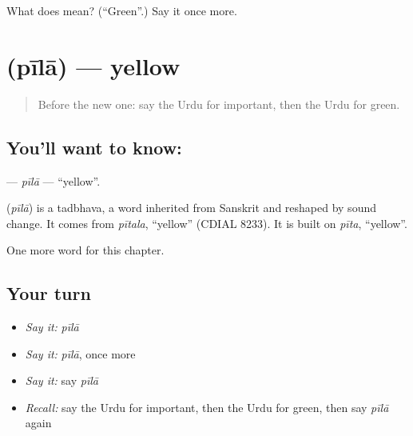 \begin{tcolorbox}[breakable,colback=teal!4,colframe=teal!35!black,title={Before you move on}]
What does  mean? (\textquotedblleft{}Green\textquotedblright{}.) Say it once more.
\end{tcolorbox}
\section[\texorpdfstring{\ur{پیلا} (pīlā)}{پیلا (pīlā)}]{ (pīlā) — yellow}

\label{lesson:UR-C74-pila}



\begin{quote}
Before the new one: say the Urdu for important, then the Urdu for green.
\end{quote}

\subsection*{You'll want to know: }
\textbf{} — \emph{pīlā} — \textquotedblleft{}yellow\textquotedblright{}.

\begin{cousinweb}
\textbf{} (\emph{pīlā}) is a tadbhava, a word inherited from Sanskrit and reshaped by sound change. It comes from \emph{pītala}, \textquotedblleft{}yellow\textquotedblright{} (CDIAL 8233). It is built on \emph{pīta}, \textquotedblleft{}yellow\textquotedblright{}.
\end{cousinweb}

\begin{grammarlens}[title={What you've built}]
One more word for this chapter.
\end{grammarlens}

\subsection*{Your turn}
\begin{itemize}
\raggedright
  \item \emph{Say it:} \emph{pīlā}
  \item \emph{Say it:} \emph{pīlā}, once more
  \item \emph{Say it:} say \emph{pīlā}
  \item \emph{Recall:} say the Urdu for important, then the Urdu for green, then say \emph{pīlā} again
\end{itemize}

